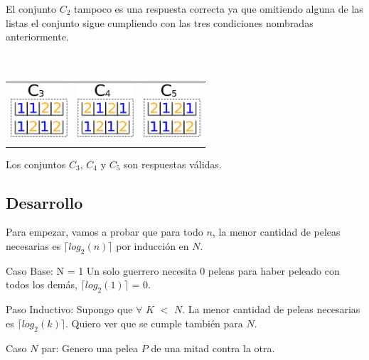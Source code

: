  El conjunto $C_{2}$ tampoco es una respuesta correcta ya que omitiendo alguna de las listas el conjunto sigue cumpliendo con las tres condiciones nombradas anteriormente. \\
 \\
 \\

{\begin{tabular}{ccc}
   \includegraphics[height=2cm]{graficos/c3.png} & \includegraphics[height=2cm]{graficos/c4.png} & \includegraphics[height=2cm]{graficos/c5.png} \\
   \\

\end{tabular}}

  Los conjuntos $C_{3}$, $C_{4}$ y $C_{5}$ son respuestas válidas. 




    \subsection{Desarrollo}

        Para empezar, vamos a probar que para todo $n$, la menor cantidad de peleas necesarias es $\lceil log_{2}(n) \rceil$ por inducción en $N$.

        Caso Base: N = 1
        Un solo guerrero necesita $0$ peleas para haber peleado con todos los demás, $\lceil log_{2}(1) \rceil$ = $0$.

        Paso Inductivo: Supongo que $\forall$ $K$ $<$ $N$. La menor cantidad de peleas necesarias es $\lceil log_{2}(k) \rceil$. Quiero ver que se cumple también para $N$.

        Caso $N$ par:
        Genero una pelea $P$ de una mitad contra la otra. 

